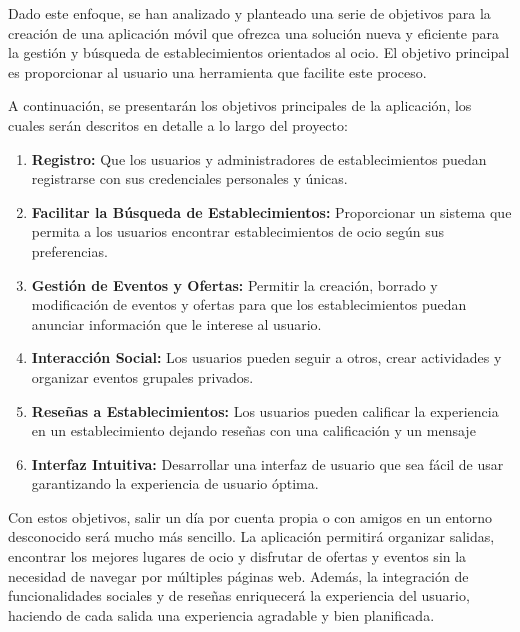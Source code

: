 Dado este enfoque, se han analizado y planteado una serie de objetivos para la creación de una aplicación móvil
que ofrezca una solución nueva y eficiente para la gestión y búsqueda de establecimientos orientados al ocio. El
objetivo principal es proporcionar al usuario una herramienta que facilite este proceso.

A continuación, se presentarán los objetivos principales de la aplicación, los cuales serán descritos en detalle
a lo largo del proyecto:

\begin{enumerate}
    \item \textbf{Registro:} Que los usuarios y administradores de establecimientos puedan registrarse con sus
          credenciales personales y únicas.
    \item \textbf{Facilitar la Búsqueda de Establecimientos:} Proporcionar un sistema que permita a los usuarios
          encontrar establecimientos de ocio según sus preferencias.
    \item \textbf{Gestión de Eventos y Ofertas:} Permitir la creación, borrado y modificación de eventos y
          ofertas para que los establecimientos puedan anunciar información que le interese al usuario.
    \item \textbf{Interacción Social:} Los usuarios pueden seguir a otros, crear actividades y organizar eventos
          grupales privados.
    \item \textbf{Reseñas a Establecimientos:} Los usuarios pueden calificar la experiencia en un
          establecimiento dejando reseñas con una calificación y un mensaje
    \item \textbf{Interfaz Intuitiva:} Desarrollar una interfaz de usuario que sea fácil de usar garantizando la
          experiencia de usuario óptima.
\end{enumerate}

Con estos objetivos, salir un día por cuenta propia o con amigos en un entorno desconocido será mucho más
sencillo. La aplicación permitirá organizar salidas, encontrar los mejores lugares de ocio y disfrutar de
ofertas y eventos sin la necesidad de navegar por múltiples páginas web. Además, la integración de
funcionalidades sociales y de reseñas enriquecerá la experiencia del usuario, haciendo de cada salida una
experiencia agradable y bien planificada.

